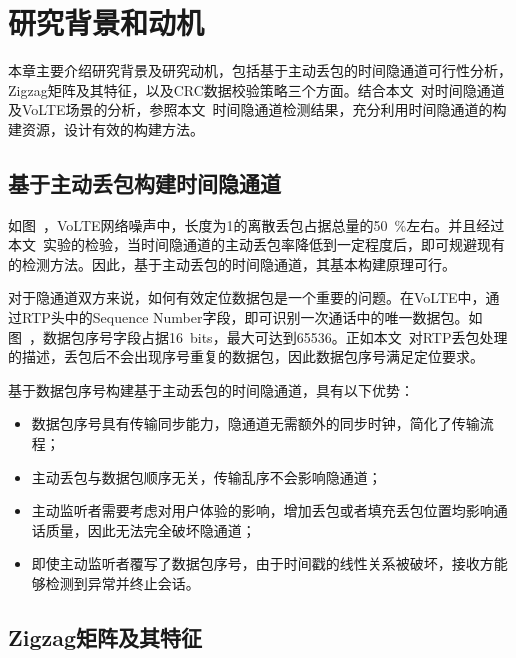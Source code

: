 \section{研究背景和动机}
\label{chap:zigzag:motivation}

本章主要介绍研究背景及研究动机，包括基于主动丢包的时间隐通道可行性分析，Zigzag矩阵及其特征，以及CRC数据校验策略三个方面。结合本文\ 对时间隐通道及VoLTE场景的分析，参照本文\ 时间隐通道检测结果，充分利用时间隐通道的构建资源，设计有效的构建方法。

\subsection{基于主动丢包构建时间隐通道}
\label{chap:zigzag:motivation:dropout}
如图\ ，VoLTE网络噪声中，长度为1的离散丢包占据总量的{50\ \%}左右。并且经过本文\ 实验的检验，当时间隐通道的主动丢包率降低到一定程度后，即可规避现有的检测方法。因此，基于主动丢包的时间隐通道，其基本构建原理可行。

对于隐通道双方来说，如何有效定位数据包是一个重要的问题。在VoLTE中，通过RTP头中的Sequence Number字段，即可识别一次通话中的唯一数据包。如图\ ，数据包序号字段占据{16\ bits}，最大可达到65536。正如本文\ 对RTP丢包处理的描述，丢包后不会出现序号重复的数据包，因此数据包序号满足定位要求。

基于数据包序号构建基于主动丢包的时间隐通道，具有以下优势：
\begin{itemize}
    \item 数据包序号具有传输同步能力，隐通道无需额外的同步时钟，简化了传输流程；
    \item 主动丢包与数据包顺序无关，传输乱序不会影响隐通道；
    \item 主动监听者需要考虑对用户体验的影响，增加丢包或者填充丢包位置均影响通话质量，因此无法完全破坏隐通道；
    \item 即使主动监听者覆写了数据包序号，由于时间戳的线性关系被破坏，接收方能够检测到异常并终止会话。
\end{itemize}

\subsection{Zigzag矩阵及其特征}
\label{chap:zigzag:motivation:zigzag}

